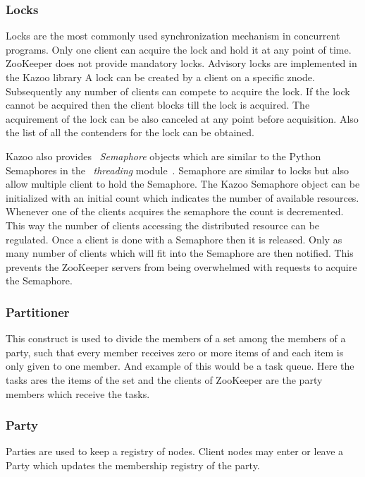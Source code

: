   \subsubsection{Locks}
    Locks are the most commonly used synchronization mechanism in concurrent programs. Only one client can acquire the lock and hold it at any point of time. ZooKeeper does not provide mandatory locks. Advisory locks are implemented in the Kazoo library A lock can be created by a client on a specific znode. Subsequently any number of clients can compete to acquire the lock. If the lock cannot be acquired then the client blocks till the lock is acquired. The acquirement of the lock can be also canceled at any point before acquisition. Also the list of all the contenders for the lock can be obtained.
    
    Kazoo also provides ~\textit{Semaphore} objects which are similar to the Python Semaphores in the ~\textit{threading} module~\cite{pythonSemaphore}. Semaphore are similar to locks but also allow multiple client to hold the Semaphore. The Kazoo Semaphore object can be initialized with an initial count which indicates the number of available resources. Whenever one of the clients acquires the semaphore the count is decremented. This way the number of clients accessing the distributed resource can be regulated. Once a client is done with a Semaphore then it is released. Only as many number of clients which will fit into the Semaphore are then notified. This prevents the ZooKeeper servers from being overwhelmed with requests to acquire the Semaphore.
  
  \subsubsection{Partitioner}
  This construct is used to divide the members of a set among the members of a party, such that every member receives zero or more items of and each item is only given to one member. And example of this would be a task queue. Here the tasks ares the items of the set and the clients of ZooKeeper are the party members which receive the tasks.
  
  \subsubsection{Party}
    Parties are used to keep a registry of nodes. Client nodes may enter or leave a Party which updates the membership registry of the party.
  
